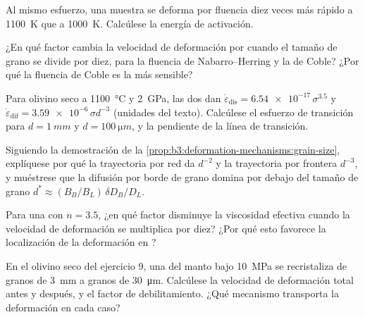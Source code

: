 \begin{exercise}[$\star\star$]\label{exo:b3:deformation-mechanisms:7}
Al mismo esfuerzo, una muestra se deforma por fluencia diez veces más rápido a
\qty{1100}{K} que a \qty{1000}{K}. Calcúlese la energía de activación.
\end{exercise}

\begin{exercise}[$\star\star$]\label{exo:b3:deformation-mechanisms:8}
¿En qué factor cambia la velocidad de deformación por  cuando el
tamaño de grano se divide por diez, para la fluencia de Nabarro--Herring y la de Coble?
¿Por qué la fluencia de Coble es la más sensible?
\end{exercise}

\begin{exercise}[$\star\star$]\label{exo:b3:deformation-mechanisms:9}
Para olivino seco a \qty{1100}{\celsius} y \qty{2}{GPa}, las dos  dan
$\dot\varepsilon_{\mathrm{dis}} = \num{6.54e-17}\,\sigma^{3.5}$ y
$\dot\varepsilon_{\mathrm{dif}} = \num{3.59e-6}\,\sigma d^{-3}$ (unidades del
texto). Calcúlese el esfuerzo de transición para $d = \qty{1}{mm}$ y $d =
\qty{100}{\micro m}$, y la pendiente de la línea de transición.
\end{exercise}

\begin{exercise}[$\star\star\star$]\label{exo:b3:deformation-mechanisms:10}
Siguiendo la demostración de la \cref{prop:b3:deformation-mechanisms:grain-size},
explíquese por qué la trayectoria por red da $d^{-2}$ y la trayectoria por frontera $d^{-3}$, y
muéstrese que la difusión por borde de grano domina por debajo del tamaño de grano $d^* \approx
(B_B/B_L)\,\delta D_B/D_L$.
\end{exercise}

\begin{exercise}[$\star\star\star$]\label{exo:b3:deformation-mechanisms:11}
Para una  con $n = 3.5$, ¿en qué factor disminuye la viscosidad efectiva
cuando la velocidad de deformación se multiplica por diez? ¿Por qué esto favorece la
localización de la deformación en ?
\end{exercise}

\begin{exercise}[$\star\star\star$]\label{exo:b3:deformation-mechanisms:12}
En el olivino seco del ejercicio 9, una  del manto bajo \qty{10}{MPa}
se recristaliza de granos de \qty{3}{mm} a granos de \qty{30}{\micro m}. Calcúlese la
velocidad de deformación total antes y después, y el factor de debilitamiento. ¿Qué
mecanismo transporta la deformación en cada caso?
\end{exercise}

